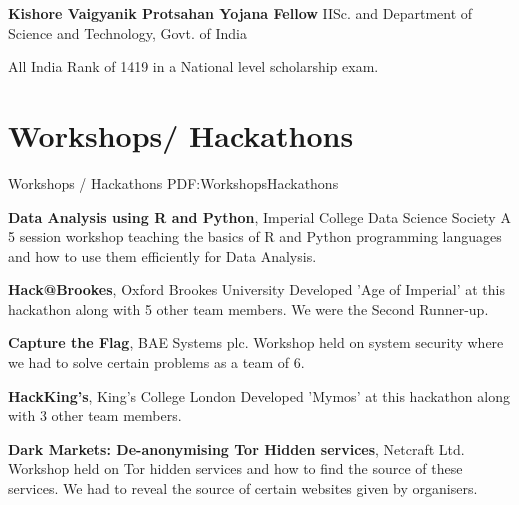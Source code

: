 \documentclass[letterpaper,10pt,oneside]{article}
\begin{document}
\begin{body}
\GapNoBreak

\BulletItem
\textbf{Kishore Vaigyanik Protsahan Yojana Fellow}
\hfill
{}
\newline
IISc. and Department of Science and Technology, Govt. of India
\begin{detail}
\SubItem
All India Rank of 1419 in a National level scholarship exam.
\end{detail}



\section
{Workshops/ Hackathons}
{Workshops / Hackathons}
{PDF:WorkshopsHackathons}

\BulletItem
\textbf{Data Analysis using R and Python},
\hfill
{}
\newline
Imperial College Data Science Society
\newline
A 5 session workshop teaching the basics of R and Python programming languages and how to use them efficiently for Data Analysis.
\GapNoBreak

\BulletItem
\textbf{Hack@Brookes},
\hfill
{}
\newline
Oxford Brookes University
\newline
Developed 'Age of Imperial' at this hackathon along with 5 other team members. We were the Second Runner-up.

\GapNoBreak

\BulletItem
\textbf{Capture the Flag},
\hfill
{}
\newline
BAE Systems plc.
\newline
Workshop held on system security where we had to solve certain problems as a team of 6.

\GapNoBreak

\BulletItem
\textbf{HackKing's},
\hfill
{}
\newline
King's College London
\newline
Developed 'Mymos' at this hackathon along with 3 other team members.
\GapNoBreak

\BulletItem
\textbf{Dark Markets: De-anonymising Tor Hidden services},
\hfill
{}
\newline
Netcraft Ltd.
\newline
Workshop held on Tor hidden services and how to find the source of these services. We had to reveal the source of certain websites given by organisers.


\end{body}
\end{document}
